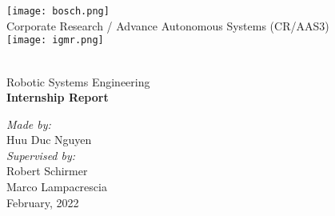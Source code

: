 \begin{titlepage}
	\begin{center}
		\begin{multicols}{2}
			\texttt{[image: bosch.png]}\\
			Corporate Research / Advance Autonomous Systems (CR/AAS3)\\
			\texttt{[image: igmr.png]}\\~\\
		\end{multicols}	
		\vspace*{5cm}
		\large Robotic Systems Engineering\\
		\Huge \textbf{Internship Report}
		
		\vspace{2.5cm}
		\large
		\textit{Made by:}\\
		Huu Duc Nguyen\\
		\vspace*{1.5cm}
		\textit{Supervised by:}\\
		Robert Schirmer\\
		Marco Lampacrescia\\		
		\vfill		
		February, 2022
		
	\end{center}
\end{titlepage}